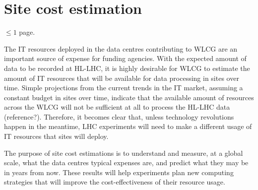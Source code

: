 \section{Site cost estimation}

$\leq 1$ page.

The IT resources deployed in the data centres contributing to WLCG are an important source of expense for funding agencies.
With the expected amount of data to be recorded at HL-LHC, it is highly desirable for WLCG to estimate the
amount of IT resources that will be available for data processing in sites over time.
Simple projections from the current trends in the IT market, assuming a constant budget in sites over time, indicate that
the available amount of resources across the WLCG will not be sufficient at all to process the HL-LHC data (reference?).
Therefore, it becomes clear that, unless technology revolutions happen in the meantime,
LHC experiments will need to make a different usage of IT resources that sites will deploy.

The purpose of site cost estimations is to understand and measure, at a global scale,
what the data centres typical expenses are, and predict what they may be in years from now.
These results will help experiments plan new computing strategies that
will improve the cost-effectiveness of their resource usage.





